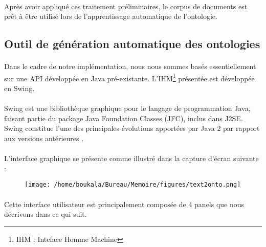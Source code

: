 \documentclass[12pt, a4paper, oneside]{book}
\begin{document}
\paragraph{}
Après avoir appliqué ces traitement préliminaires, le corpus de documents est prêt à être utilisé lors de l'apprentissage automatique de l'ontologie. 

\subsection{Outil de génération automatique des ontologies}
\paragraph{}
Dans le cadre de notre implémentation, nous nous sommes basés essentiellement sur une API développée en Java pré-existante. L'IHM\footnote{IHM : Inteface Homme Machine} présentée est développée en Swing.
\paragraph{}
Swing est une bibliothèque graphique pour le langage de programmation Java, faisant partie du package Java Foundation Classes (JFC), inclus dans J2SE. Swing constitue l'une des principales évolutions apportées par Java 2 par rapport aux versions antérieures \citep{swing}.
\paragraph{}
L'interface graphique se présente comme illustré dans la capture d'écran suivante :

\begin{figure}[h!]
\begin{center}
\texttt{[image: /home/boukala/Bureau/Memoire/figures/text2onto.png]}
\end{center}
\end{figure}
 

\paragraph{}
Cette interface utilisateur est principalement composée de 4 panels que nous décrivons dans ce qui suit.
\end{document}
